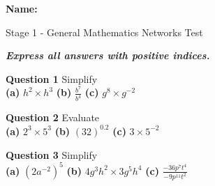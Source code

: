\documentclass{article}
\begin{document}


{\Large \textbf{Name:}} \hspace{3cm} \vspace{1cm}


\begin{center}
{\Huge Stage 1 - General Mathematics Networks Test}
\end{center}

\vspace{0.6cm}
\begin{center}
{\Large \emph{\textbf{Express all answers with positive indices.}}}
\end{center}
\vspace{0.2cm}

{\Large \textbf{Question 1} Simplify \\[6pt]
\textbf{(a)} {\Large $h^2 \times h^3$} \hfill \textbf{(b)} {\huge $\frac{b^7}{b^4}$} \hfill \textbf{(c)} {\Large $g^8 \times g^{-2}$}}

\vspace{0.1cm}
\begin{center}
\end{center}
\vspace{0.6cm}

{\Large \textbf{Question 2} Evaluate \\[6pt]
\textbf{(a)} {\Large $2^3 \times 5^3$} \hfill \textbf{(b)} {\Large $(32)^{0.2}$} \hfill \textbf{(c)} {\Large $3 \times 5^{-2}$}}

\vspace{0.1cm}
\begin{center}
\end{center}

\pagebreak
{\Large \textbf{Question 3} Simplify \\[6pt]
\textbf{(a)} {\Large $(2a^{-2})^5$} \hfill \textbf{(b)} {\Large $4g^3h^2 \times 3g^5h^4$} \hfill \textbf{(c)} {\huge $\frac{-36p^7t^4}{-9p^{11}t^{2}}$}}

\vspace{0.1cm}
\begin{center}
\end{center}
\end{document}
